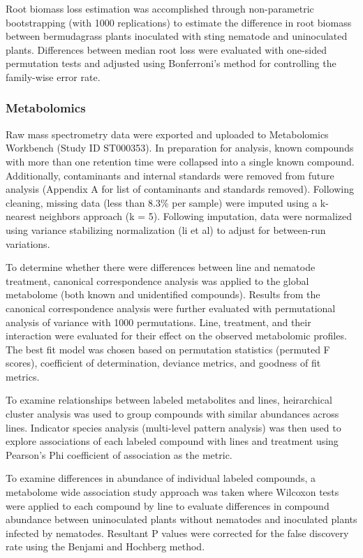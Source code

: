 \documentclass[9pt,lineno]{elife}
\begin{document}
Root biomass loss estimation was accomplished through non-parametric bootstrapping (with 1000 replications) to estimate the difference in root biomass between bermudagrass plants inoculated with sting nematode and uninoculated plants.  Differences between median root loss were evaluated with one-sided permutation tests and adjusted using Bonferroni's method for controlling the family-wise error rate.


\subsubsection{Metabolomics}

Raw mass spectrometry data were exported and uploaded to Metabolomics Workbench (Study ID ST000353).  In preparation for analysis, known compounds with more than one retention time were collapsed into a single known compound.  Additionally, contaminants and internal standards were removed from future analysis (Appendix A for list of contaminants and standards removed).  Following cleaning, missing data (less than 8.3\% per sample) were imputed using a k-nearest neighbors approach (k = 5).  Following imputation, data were normalized using variance stabilizing normalization (li et al) to adjust for between-run variations.  

To determine whether there were differences between line and nematode treatment, canonical correspondence analysis was applied to the global metabolome (both known and unidentified compounds).  Results from the canonical correspondence analysis were further evaluated with permutational analysis of variance with 1000 permutations. Line, treatment, and their interaction were evaluated for their effect on the observed metabolomic profiles.  The best fit model was chosen based on permutation statistics (permuted F scores), coefficient of determination, deviance metrics, and goodness of fit metrics.  

To examine relationships between labeled metabolites and lines, heirarchical cluster analysis was used to group compounds with similar abundances across lines.  Indicator species analysis (multi-level pattern analysis) was then used to explore associations of each labeled compound with lines and treatment using Pearson's Phi coefficient of association as the metric. 

To examine differences in abundance of individual labeled compounds, a metabolome wide association study approach was taken where Wilcoxon tests were applied to each compound by line to evaluate differences in compound abundance between uninoculated plants without nematodes and inoculated plants infected by nematodes.  Resultant P values were corrected for the false discovery rate using the Benjami and Hochberg method.  
\end{document}
